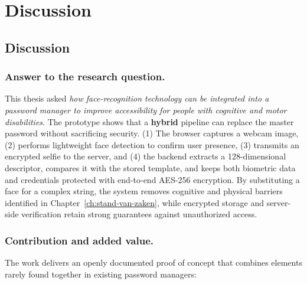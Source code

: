 
\chapter{Discussion}%
\label{ch:conclusie}


\section{Discussion}

\subsection{Answer to the research question.}
This thesis asked \emph{how face-recognition technology can be integrated into a password manager to improve accessibility for people with cognitive and motor disabilities}.  
The prototype shows that a \textbf{hybrid} pipeline can replace the master password without sacrificing security.  
(1) The browser captures a webcam image, (2) performs lightweight face detection to confirm user presence, (3) transmits an encrypted selfie to the server, and (4) the backend extracts a 128-dimensional descriptor, compares it with the stored template, and keeps both biometric data and credentials protected with end-to-end AES-256 encryption.  
By substituting a face for a complex string, the system removes cognitive and physical barriers identified in Chapter~\ref{ch:stand-van-zaken}, while encrypted storage and server-side verification retain strong guarantees against unauthorized access.

\subsection{Contribution and added value.}
The work delivers an openly documented proof of concept that combines elements rarely found together in existing password managers:


